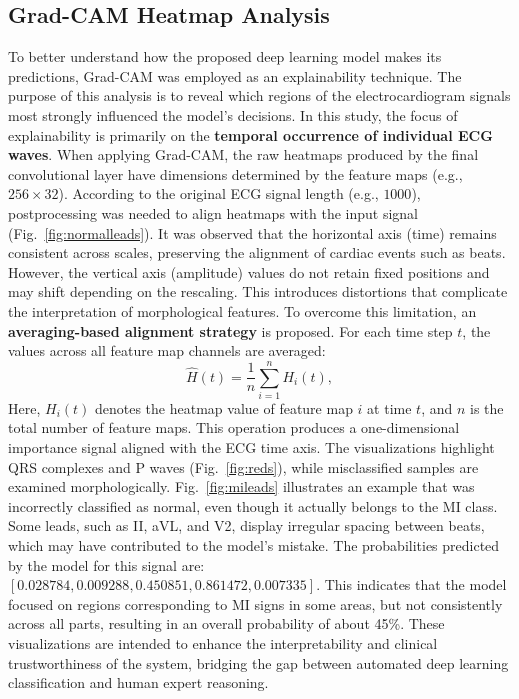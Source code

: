 \documentclass[a4paper,fleqn]{cas-dc}
\begin{document}
\subsection{Grad-CAM Heatmap Analysis}
To better understand how the proposed deep learning model makes its predictions, Grad-CAM was employed as an explainability technique. The purpose of this analysis is to reveal which regions of the electrocardiogram signals most strongly influenced the model's decisions. In this study, the focus of explainability is primarily on the \textbf{temporal occurrence of individual ECG waves}. When applying Grad-CAM, the raw heatmaps produced by the final convolutional layer have dimensions determined by the feature maps (e.g., $256 \times 32$). According to the original ECG signal length (e.g., $1000$), postprocessing was needed to align heatmaps with the input signal (Fig.~\ref{fig:normalleads}). It was observed that the horizontal axis (time) remains consistent across scales, preserving the alignment of cardiac events such as beats. However, the vertical axis (amplitude) values do not retain fixed positions and may shift depending on the rescaling. This introduces distortions that complicate the interpretation of morphological features. To overcome this limitation, an \textbf{averaging-based alignment strategy} is proposed. For each time step $t$, the values across all feature map channels are averaged:
\begin{equation}
\hat{H}(t) = \frac{1}{n} \sum_{i=1}^{n} H_i(t),
\end{equation}
Here, $H_i(t)$ denotes the heatmap value of feature map $i$ at time $t$, and $n$ is the total number of feature maps.
This operation produces a one-dimensional importance signal aligned with the ECG time axis. The visualizations highlight QRS complexes and P waves (Fig.~\ref{fig:reds}), while misclassified samples are examined morphologically. Fig.~\ref{fig:mileads} illustrates an example that was incorrectly classified as normal, even though it actually belongs to the MI class. Some leads, such as II, aVL, and V2, display irregular spacing between beats, which may have contributed to the model's mistake. The probabilities predicted by the model for this signal are: $[0.028784, 0.009288, 0.450851, 0.861472, 0.007335]$.
This indicates that the model focused on regions corresponding to MI signs in some areas, but not consistently across all parts, resulting in an overall probability of about 45\%. These visualizations are intended to enhance the interpretability and clinical trustworthiness of the system, bridging the gap between automated deep learning classification and human expert reasoning.
\end{document}
